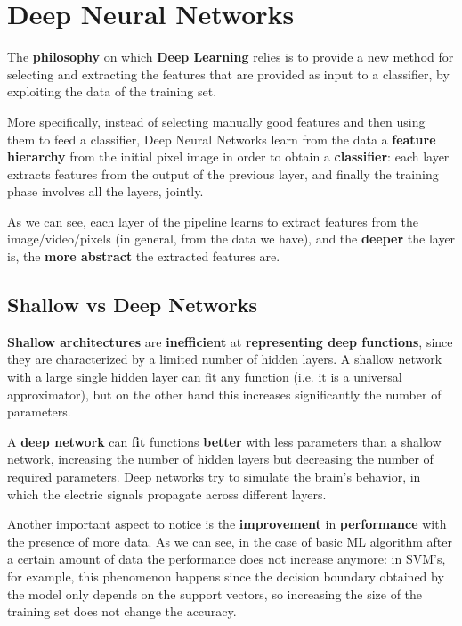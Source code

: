 \section{Deep Neural Networks} \label{ch4}
The \textbf{philosophy} on which \textbf{Deep Learning} relies is to provide a new method for selecting and extracting the features that are provided as input to a classifier, by exploiting the data of the training set. 

More specifically, instead of selecting manually good features and then using them to feed a classifier, Deep Neural Networks learn from the data a \textbf{feature hierarchy} from the initial pixel image in order to obtain a \textbf{classifier}: each layer extracts features from the output of the previous layer, and finally the training phase involves all the layers, jointly.

As we can see, each layer of the pipeline learns to extract features from the image/video/pixels (in general, from the data we have), and the \textbf{deeper} the layer is, the \textbf{more abstract} the extracted features are.

\subsection{Shallow vs Deep Networks} \textbf{Shallow architectures} are \textbf{inefficient} at \textbf{representing deep functions}, since they are characterized by a limited number of hidden layers. A shallow network with a large single hidden layer can fit any function (i.e. it is a universal approximator), but on the other hand this increases significantly the number of parameters. 

A \textbf{deep network} can \textbf{fit} functions \textbf{better} with less parameters than a shallow network, increasing the number of hidden layers but decreasing the number of required parameters. Deep networks try to simulate the brain's behavior, in which the electric signals propagate across different layers.

Another important aspect to notice is the \textbf{improvement} in \textbf{performance} with the presence of more data.
As we can see, in the case of basic ML algorithm after a certain amount of data the performance does not increase anymore: in SVM's, for example, this phenomenon happens since the decision boundary obtained by the model only depends on the support vectors, so increasing the size of the training set does not change the accuracy.

